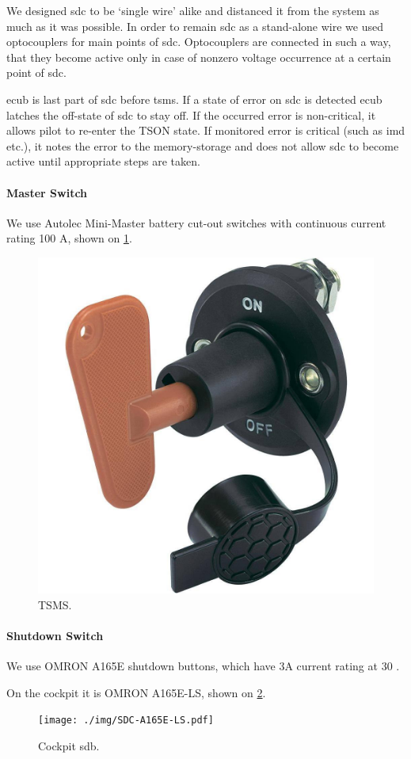 We designed \gls{sdc} to be ‘single wire’ alike and distanced it from the system as much as it was possible. In order to remain \gls{sdc} as a stand-alone wire we used optocouplers for main points of \gls{sdc}. Optocouplers are connected in such a way, that they become active only in case of nonzero voltage occurrence at a certain point of \gls{sdc}.

\Gls{ecub} is last part of \gls{sdc} before \gls{tsms}. If a state of error on \gls{sdc} is detected \gls{ecub} latches the off-state of \gls{sdc} to stay off. If the occurred error is non-critical, it allows pilot to re-enter the TSON state. If monitored error is critical (such as \gls{imd} etc.), it notes the error to the memory-storage and does not allow \gls{sdc} to become active until appropriate steps are taken.

\paragraph{Master Switch}
We use Autolec Mini-Master battery cut-out switches with continuous current rating 100 A, shown on \ref{fig:SDC-TSMS}.
\begin{figure}[H]
	\centering
	\includegraphics[width=.5\textwidth]{./img/SDC-TSMS.jpg}
	\caption{TSMS.}
	\label{fig:SDC-TSMS}
\end{figure}

\paragraph{Shutdown Switch}
We use OMRON A165E shutdown buttons, which have 3A current rating at 30 \vdc.

On the cockpit it is OMRON A165E-LS, shown on \ref{fig:SDC-A165E-LS}.
\begin{figure}[H]
	\centering
	\texttt{[image: ./img/SDC-A165E-LS.pdf]}
	\caption{Cockpit \gls{sdb}.}
	\label{fig:SDC-A165E-LS}
\end{figure}

